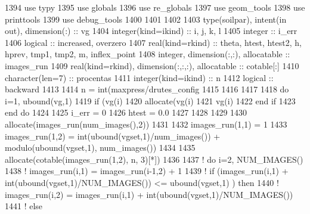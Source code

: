 \begin{DoxyCode}
1394       \textcolor{keywordtype}{use }typy
1395       \textcolor{keywordtype}{use }globals
1396       \textcolor{keywordtype}{use }re_globals
1397       \textcolor{keywordtype}{use }geom_tools
1398       \textcolor{keywordtype}{use }printtools
1399       \textcolor{keywordtype}{use }debug_tools
1400       
1401       
1402       
1403       \textcolor{keywordtype}{type}(soilpar), \textcolor{keywordtype}{intent(in out)}, \textcolor{keywordtype}{dimension(:)} :: vg
1404       \textcolor{keywordtype}{integer(kind=ikind)} :: i, j, k, l
1405       \textcolor{keywordtype}{integer} :: i\_err
1406       \textcolor{keywordtype}{logical} :: increased, overzero
1407       \textcolor{keywordtype}{real(kind=rkind)} :: theta, htest, htest2, h, hprev, tmp1, tmp2, m,\textcolor{comment}{ inflex\_point}
1408 \textcolor{comment}{      }\textcolor{keywordtype}{integer}, \textcolor{keywordtype}{dimension(:,:)}, \textcolor{keywordtype}{allocatable} :: images\_run
1409       \textcolor{keywordtype}{real(kind=rkind)}, \textcolor{keywordtype}{dimension(:,:,:)}, \textcolor{keywordtype}{allocatable} :: cotable[:]
1410       \textcolor{keywordtype}{character(len=7)} :: procentas
1411       \textcolor{keywordtype}{integer(kind=ikind)} :: n
1412       \textcolor{keywordtype}{logical} :: backward
1413 
1414       n = int(maxpress/drutes_config%
1415 
1416 
1417 
1418       \textcolor{keywordflow}{do} i=1, ubound(vg,1)
1419         \textcolor{keywordflow}{if} (vg(i)%
1420          \textcolor{keyword}{allocate}(vg(i)%
1421          vg(i)%
1422 \textcolor{keywordflow}{        end if}
1423 \textcolor{keywordflow}{      end do}
1424 
1425       i\_err = 0
1426       htest = 0.0
1427     
1428 
1429         
1430       \textcolor{keyword}{allocate}(images\_run(num\_images(),2))
1431       
1432       images\_run(1,1) = 1
1433       images\_run(1,2) = int(ubound(vgset,1)/num\_images()) + modulo(ubound\textcolor{comment}{(vgset,1), num\_images())}
1434 \textcolor{comment}{}
1435 \textcolor{comment}{      }\textcolor{keyword}{allocate}(cotable(images\_run(1,2), n, 3)[*])
1436 
1437 \textcolor{comment}{!       do i=2, NUM\_IMAGES()}
1438 \textcolor{comment}{!       images\_run(i,1) = images\_run(i-1,2) + 1}
1439 \textcolor{comment}{!       if (images\_run(i,1) + int(ubound(vgset,1)/NUM\_IMAGES()) <= ubound(vgset,1) ) then}
1440 \textcolor{comment}{!         images\_run(i,2) = images\_run(i,1) + int(ubound(vgset,1)/NUM\_IMAGES())}
1441 \textcolor{comment}{!       else}

\end{DoxyCode}
